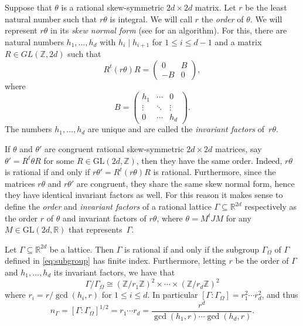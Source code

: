 \documentclass[reqno, a4paper]{amsart}
\numberwithin{equation}{section}
\newcommand{\Z}{\mathbb{Z}}   %
\newcommand{\R}{\mathbb{R}}   %
\def\subgroup#1{{#1}_\Omega}
\begin{document}
Suppose that $\theta$ is a rational skew-symmetric $2d \times 2d$ matrix. Let $r$ be the least natural number such that $r \theta$ is integral. We will call $r$ the \emph{order} of $\theta$. We will represent $r\theta$ in its \emph{skew normal form} (see \cite[p.\ 57, Theorem IV.1]{Ne72} for an algorithm). For this, there are natural numbers $h_1, \ldots, h_{d}$ with $h_i \mid h_{i+1}$ for $1 \leq i \leq d-1$ and a matrix $R \in GL(\Z,2d)$ such that
\begin{equation}
\label{eq:block_form}
R^t (r \theta) R = \begin{pmatrix} 0 & B \\ -B & 0 \end{pmatrix},
\end{equation}
where
\[
B = \begin{pmatrix} h_1 & \cdots & 0 \\ \vdots & \ddots & \vdots \\ 0 & \cdots & h_d \end{pmatrix}.
\]
The numbers $h_1, \ldots, h_d$ are unique and are called the \emph{invariant factors} of~$r\theta$.

If $\theta$ and $\theta'$ are congruent rational skew-symmetric $2d \times 2d$ matrices, say $\theta' = R^t \theta R$ for some $R \in \mathrm{GL}(2d,\Z)$, then they have the same order. Indeed, $r\theta$ is rational if and only if $r\theta' = R^t (r\theta) R$ is rational. Furthermore, since the matrices $r\theta$ and $r\theta'$ are congruent, they share the same skew normal form, hence they have identical invariant factors as well. For this reason it makes sense to define the \emph{order} and \emph{invariant factors} of a rational lattice $\Gamma \subseteq \R^{2d}$ respectively as the order $r$ of $\theta$ and invariant factors of $r\theta$, where $\theta = M^t J M$ for any $M \in \mathrm{GL}(2d,\R)$ that represents~$\Gamma$.

\begin{proposition}
\label{prop:rational-lattice}
Let $\Gamma \subseteq \R^{2d}$ be a lattice. 
Then $\Gamma$ is rational if and only if the subgroup $\subgroup{\Gamma}$ of $\Gamma$ defined in \eqref{eq:subgroup} has finite index. 
Furthermore, letting $r$ be the order of $\Gamma$ and $h_1, \ldots, h_d$ its invariant factors, we have that
\[ 
\Gamma / \subgroup{\Gamma} \cong ( \Z / r_1 \Z)^2 \times \cdots \times (\Z / r_d \Z)^2 
\]
where $r_i = r / \gcd(h_i,r)$ for $1 \leq i \leq d$. 
In particular $[ \Gamma : \subgroup{\Gamma} ] = r_1^2 \cdots r_d^2$, and thus
\[ 
n_\Gamma
= [ \Gamma : \subgroup{\Gamma} ]^{1/2}
= r_1 \cdots r_d
= \frac{r^d}{\gcd(h_1,r)\cdots\gcd(h_d,r)}.
\]
\end{proposition}
\end{document}
